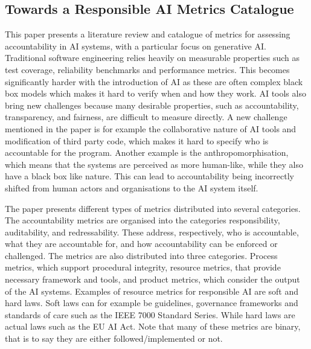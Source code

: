 \documentclass[a4paper, 11pt]{article}
\begin{document}
\subsection{Towards a Responsible AI Metrics Catalogue}
This paper presents a literature review and catalogue of metrics for assessing accountability in AI systems, with a particular focus on generative AI. Traditional software engineering relies heavily on measurable properties such as test coverage, reliability benchmarks and performance metrics. This becomes significantly harder with the introduction of AI as these are often complex black box models which makes it hard to verify when and how they work. AI tools also bring new challenges because many desirable properties, such as accountability, transparency, and fairness, are difficult to measure directly. A new challenge mentioned in the paper is for example the collaborative nature of AI tools and modification of third party code, which makes it hard to specify who is accountable for the program. Another example is the anthropomorphisation, which means that the systems are perceived as more human-like, while they also have a black box like nature. This can lead to accountability being incorrectly shifted from human actors and organisations to the AI system itself. 

The paper presents different types of metrics distributed into several categories.  The accountability metrics are organised into the categories responsibility, auditability, and redressability. These address, respectively, who is accountable, what they are accountable for, and how accountability can be enforced or challenged. The metrics are also distributed into three categories. Process metrics, which support procedural integrity, resource metrics, that provide necessary framework and tools, and product metrics, which consider the output of the AI systems. Examples of resource metrics for responsible AI are soft and hard laws. Soft laws can for example be guidelines, governance frameworks and standards of care such as the IEEE 7000 Standard Series.  While hard laws are actual laws such as the EU AI Act. Note that many of these metrics are binary, that is to say they are either followed/implemented or not. 
\end{document}
